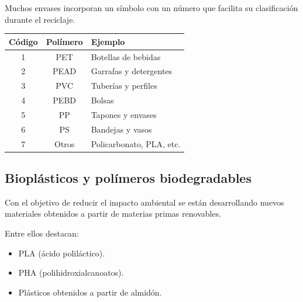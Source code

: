 Muchos envases incorporan un símbolo con un número que facilita su clasificación
durante el reciclaje.

\begin{center}

\renewcommand{\arraystretch}{1.3}

\begin{tabular}{ccl}

\toprule

\textbf{Código} &
\textbf{Polímero} &
\textbf{Ejemplo}

\\

\midrule

1 & PET & Botellas de bebidas \\

2 & PEAD & Garrafas y detergentes \\

3 & PVC & Tuberías y perfiles \\

4 & PEBD & Bolsas \\

5 & PP & Tapones y envases \\

6 & PS & Bandejas y vasos \\

7 & Otros & Policarbonato, PLA, etc. \\

\bottomrule

\end{tabular}

\end{center}


\subsection{Bioplásticos y polímeros biodegradables}

Con el objetivo de reducir el impacto ambiental se están desarrollando nuevos
materiales obtenidos a partir de materias primas renovables.

Entre ellos destacan:

\begin{itemize}

\item PLA (ácido poliláctico).

\item PHA (polihidroxialcanoatos).

\item Plásticos obtenidos a partir de almidón.

\end{itemize}

